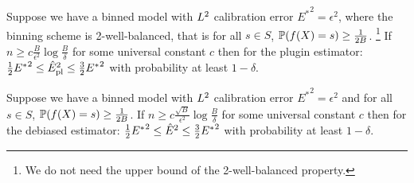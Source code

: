 
\newcommand{\finalPluginText}{
Suppose we have a binned model with $\lsquared{}$ calibration error ${E^*}^2 = \epsilon^2$, where the binning scheme is 2-well-balanced, that is for all $s \in S$, $\prob(f(X) = s) \geq \frac{1}{2B}$.
  \footnote{We do not need the upper bound of the 2-well-balanced property.}
  If $n \geq c\frac{B}{\epsilon^2}\log{\frac{B}{\delta}}$ for some universal constant $c$ then for the plugin estimator: $\frac{1}{2} {E^*}^2 \leq \pluginEst{} \leq \frac{3}{2} {E^*}^2$ with probability at least $1 - \delta$.
}

\begin{theorem}
\label{thm:final-plugin}
\finalPluginText{}
\end{theorem}

\newtheorem*{finalPlugin}{Restatement of Theorem~\ref{thm:final-plugin}}

\newcommand{\finalCancelingText}{
Suppose we have a binned model with $\lsquared{}$ calibration error ${E^*}^2 = \epsilon^2$ and for all $s \in S$, $\prob(f(X) = s) \geq \frac{1}{2B}$. If $n \geq c\frac{\sqrt{B}}{\epsilon^2}\log{\frac{B}{\delta}}$ for some universal constant $c$ then for the debiased estimator: $\frac{1}{2} {E^*}^2 \leq \cancelEst{} \leq \frac{3}{2}{E^*}^2$ with probability at least $1 - \delta$.
}

\begin{theorem}
\label{thm:final-ours}
\finalCancelingText{}
\end{theorem}

\newtheorem*{finalCanceling}{Restatement of Theorem~\ref{thm:final-ours}}


